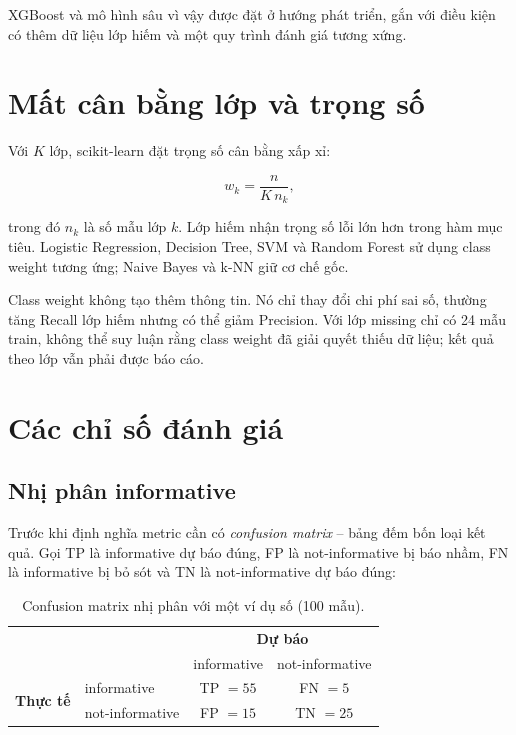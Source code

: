 XGBoost và mô hình sâu vì vậy được đặt ở hướng phát triển, gắn với điều kiện có
thêm dữ liệu lớp hiếm và một quy trình đánh giá tương xứng.

\section{Mất cân bằng lớp và trọng số}

Với \(K\) lớp, scikit-learn đặt trọng số cân bằng xấp xỉ:

\[
w_k=\frac{n}{K\,n_k},
\]

trong đó \(n_k\) là số mẫu lớp \(k\). Lớp hiếm nhận trọng số lỗi lớn hơn trong
hàm mục tiêu. Logistic Regression, Decision Tree, SVM và Random Forest sử dụng
class weight tương ứng; Naive Bayes và k-NN giữ cơ chế gốc.

Class weight không tạo thêm thông tin. Nó chỉ thay đổi chi phí sai số, thường
tăng Recall lớp hiếm nhưng có thể giảm Precision. Với lớp missing chỉ có 24 mẫu
train, không thể suy luận rằng class weight đã giải quyết thiếu dữ liệu; kết quả
theo lớp vẫn phải được báo cáo.

\section{Các chỉ số đánh giá}

\subsection{Nhị phân informative}

Trước khi định nghĩa metric cần có \emph{confusion matrix} -- bảng đếm bốn loại
kết quả. Gọi TP là informative dự báo đúng, FP là not-informative bị báo nhầm,
FN là informative bị bỏ sót và TN là not-informative dự báo đúng:

\begin{table}[H]\centering\small
\caption{Confusion matrix nhị phân với một ví dụ số (100 mẫu).}
\begin{tabular}{ll cc}
\toprule
& & \multicolumn{2}{c}{\textbf{Dự báo}}\\
& & informative & not-informative\\
\midrule
\multirow{2}{*}{\textbf{Thực tế}} & informative & TP $=55$ & FN $=5$\\
& not-informative & FP $=15$ & TN $=25$\\
\bottomrule
\end{tabular}
\end{table}

